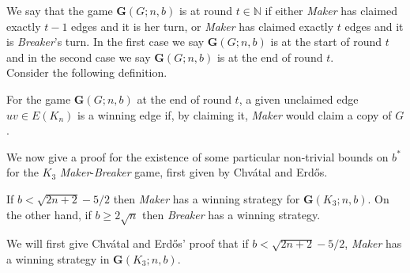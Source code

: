 \documentclass[a4paper,oneside,11pt]{report}
\begin{document}
We say that the game $\textbf{G}(G;n,b)$ is at round $t \in \mathbb{N}$ if either \textit{Maker} has claimed exactly $t-1$ edges and it is her turn, or \textit{Maker} has claimed exactly $t$ edges and it is \textit{Breaker}'s turn. In the first case we say $\textbf{G}(G;n,b)$ is at the start of round $t$ and in the second case we say $\textbf{G}(G;n,b)$ is at the end of round $t$. \\

Consider the following definition.

\begin{definition}

For the game $\textbf{G}(G;n,b)$ at the end of round $t$, a given unclaimed edge $uv \in E(K_n)$ is a winning edge if, by claiming it, \textit{Maker} would claim a copy of $G$.

\end{definition}

We now give a proof for the existence of some particular non-trivial bounds on $b^*$ for the $K_3$ \textit{Maker}-\textit{Breaker} game, first given by Chvátal and Erdős.

\begin{theorem}{\label{6}}

If $b < \sqrt{2n+2} - 5/2$ then \textit{Maker} has a winning strategy for $\textbf{G}(K_3;n,b)$. On the other hand, if $b \geqslant 2\sqrt{n}$ then \textit{Breaker} has a winning strategy. 

\end{theorem}

We will first give Chvátal and Erdős' proof that if $b < \sqrt{2n+2}-5/2$, \textit{Maker} has a winning strategy in $\textbf{G}(K_3;n,b)$.
\end{document}
